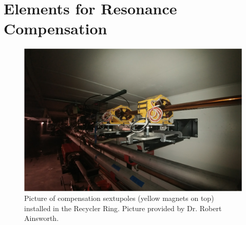 \section{\label{sec:css}Elements for Resonance Compensation}

\begin{figure}[H]
   \centering
   \includegraphics[width=\columnwidth]{chapter3/sextupoles.png}
   \caption{Picture of compensation sextupoles (yellow magnets on top) installed in the Recycler Ring. Picture provided by Dr. Robert Ainsworth.}
   \label{fig:sextupoles}
\end{figure}